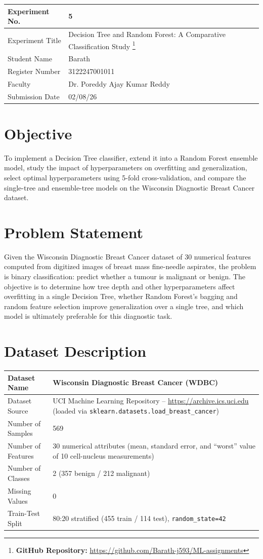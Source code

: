 \documentclass[12pt,a4paper]{article}
\begin{document}
\begin{tabular}{|p{4cm}|p{11cm}|}
\hline
Experiment No. & 5 \\ \hline
Experiment Title & Decision Tree and Random Forest: A Comparative Classification Study
\footnote{\textbf{GitHub Repository: }\url{https://github.com/Barath-j593/ML-assignments}}\\ \hline
Student Name & Barath \\ \hline
Register Number & 3122247001011 \\ \hline
Faculty & Dr. Poreddy Ajay Kumar Reddy \\ \hline
Submission Date & 02/08/26 \\ \hline
\end{tabular}

\section{Objective}
To implement a Decision Tree classifier, extend it into a Random Forest ensemble model,
study the impact of hyperparameters on overfitting and generalization, select optimal
hyperparameters using 5-fold cross-validation, and compare the single-tree and ensemble-tree
models on the Wisconsin Diagnostic Breast Cancer dataset.

\section{Problem Statement}
Given the Wisconsin Diagnostic Breast Cancer dataset of 30 numerical features computed from
digitized images of breast mass fine-needle aspirates, the problem is binary classification:
predict whether a tumour is malignant or benign. The objective is to determine how tree depth
and other hyperparameters affect overfitting in a single Decision Tree, whether Random
Forest's bagging and random feature selection improve generalization over a single tree, and
which model is ultimately preferable for this diagnostic task.

\section{Dataset Description}
\begin{longtable}{|p{6cm}|p{8cm}|}
\hline
Dataset Name & Wisconsin Diagnostic Breast Cancer (WDBC) \\ \hline
Dataset Source & UCI Machine Learning Repository -- \url{https://archive.ics.uci.edu} (loaded via \texttt{sklearn.datasets.load\_breast\_cancer}) \\ \hline
Number of Samples & 569 \\ \hline
Number of Features & 30 numerical attributes (mean, standard error, and ``worst'' value of 10 cell-nucleus measurements) \\ \hline
Number of Classes & 2 (357 benign / 212 malignant) \\ \hline
Missing Values & 0 \\ \hline
Train-Test Split & 80:20 stratified (455 train / 114 test), \texttt{random\_state=42} \\ \hline
\end{longtable}
\end{document}
